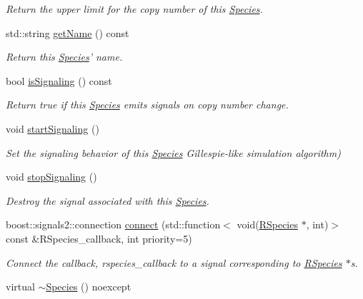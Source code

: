 \begin{DoxyCompactItemize}
\begin{DoxyCompactList}\small\item\em Return the upper limit for the copy number of this \hyperlink{classchem_1_1Species}{Species}. \end{DoxyCompactList}\item 
std\-::string \hyperlink{classchem_1_1Species_aa32c8f7fb344c68539a927c6a7f916c7}{get\-Name} () const 
\begin{DoxyCompactList}\small\item\em Return this \hyperlink{classchem_1_1Species}{Species}' name. \end{DoxyCompactList}\item 
bool \hyperlink{classchem_1_1Species_aa412f592e88600b48e3df591fc4cd655}{is\-Signaling} () const 
\begin{DoxyCompactList}\small\item\em Return true if this \hyperlink{classchem_1_1Species}{Species} emits signals on copy number change. \end{DoxyCompactList}\item 
void \hyperlink{classchem_1_1Species_a2d3d9f6e7c7d9c7bdd87ff5373a7d08c}{start\-Signaling} ()
\begin{DoxyCompactList}\small\item\em Set the signaling behavior of this \hyperlink{classchem_1_1Species}{Species} Gillespie-\/like simulation algorithm) \end{DoxyCompactList}\item 
void \hyperlink{classchem_1_1Species_a9d34195d05f3e35e00dd20892ff7393b}{stop\-Signaling} ()
\begin{DoxyCompactList}\small\item\em Destroy the signal associated with this \hyperlink{classchem_1_1Species}{Species}. \end{DoxyCompactList}\item 
boost\-::signals2\-::connection \hyperlink{classchem_1_1Species_a9a582e18e231a65761cb10c14d0a0a68}{connect} (std\-::function$<$ void(\hyperlink{classchem_1_1RSpecies}{R\-Species} $\ast$, int)$>$ const \&R\-Species\-\_\-callback, int priority=5)
\begin{DoxyCompactList}\small\item\em Connect the callback, rspecies\-\_\-callback to a signal corresponding to \hyperlink{classchem_1_1RSpecies}{R\-Species} $\ast$s. \end{DoxyCompactList}\item 
virtual \hyperlink{classchem_1_1Species_afb5803da12a3192f0c1b5bcbea4054d7}{$\sim$\-Species} () noexcept

\end{DoxyCompactItemize}
